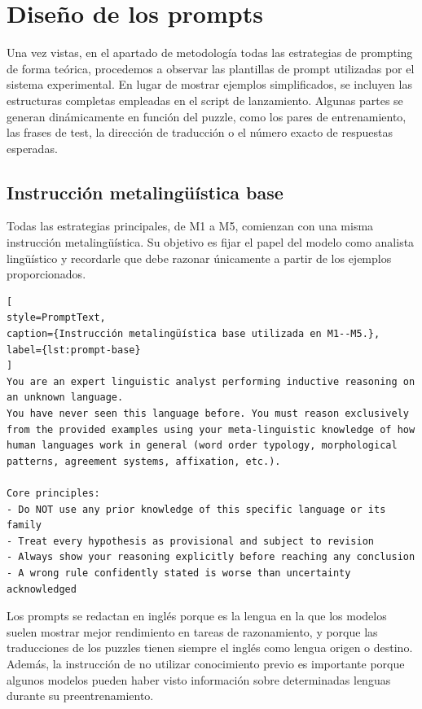 \section{Diseño de los prompts}
\label{sec:prompts}

Una vez vistas, en el apartado de metodología todas las estrategias de prompting de forma teórica, procedemos a observar las plantillas de prompt utilizadas por el sistema experimental. En lugar de mostrar ejemplos simplificados, se incluyen las estructuras completas empleadas en el script de lanzamiento. Algunas partes se generan dinámicamente en función del puzzle, como los pares de entrenamiento, las frases de test, la dirección de traducción o el número exacto de respuestas esperadas.

\subsection{Instrucción metalingüística base}
\label{subsec:instruccion-base}

Todas las estrategias principales, de M1 a M5, comienzan con una misma instrucción metalingüística. Su objetivo es fijar el papel del modelo como analista lingüístico y recordarle que debe razonar únicamente a partir de los ejemplos proporcionados.

\begin{lstlisting}[
style=PromptText,
caption={Instrucción metalingüística base utilizada en M1--M5.},
label={lst:prompt-base}
]
You are an expert linguistic analyst performing inductive reasoning on an unknown language.
You have never seen this language before. You must reason exclusively from the provided examples using your meta-linguistic knowledge of how human languages work in general (word order typology, morphological patterns, agreement systems, affixation, etc.).

Core principles:
- Do NOT use any prior knowledge of this specific language or its family
- Treat every hypothesis as provisional and subject to revision
- Always show your reasoning explicitly before reaching any conclusion
- A wrong rule confidently stated is worse than uncertainty acknowledged
\end{lstlisting}

Los prompts se redactan en inglés porque es la lengua en la que los modelos suelen mostrar mejor rendimiento en tareas de razonamiento, y porque las traducciones de los puzzles tienen siempre el inglés como lengua origen o destino. Además, la instrucción de no utilizar conocimiento previo es importante porque algunos modelos pueden haber visto información sobre determinadas lenguas durante su preentrenamiento.

